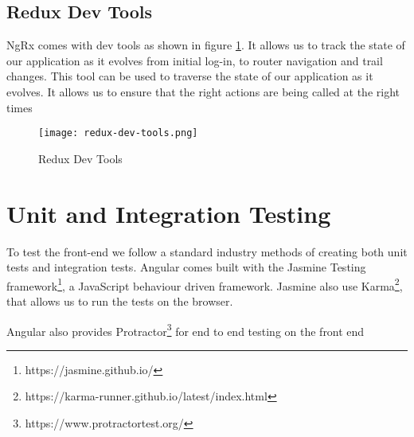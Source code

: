 \subsection{Redux Dev Tools}
NgRx comes with dev tools as shown in figure \ref{fig:reduxDevTools}. It allows us to track the state of our application as it evolves from initial log-in, to router navigation and trail changes. This tool can be used to traverse the state of our application as it evolves. It allows us to ensure that the right actions are being called at the right times
\begin{figure}[ht]
    \centering
    \texttt{[image: redux-dev-tools.png]}
    \caption{Redux Dev Tools}
    \label{fig:reduxDevTools}
\end{figure}


\section{Unit and Integration Testing}
To test the front-end we follow a standard industry methods of creating both unit tests and integration tests. Angular comes built with the Jasmine Testing framework\footnote{https://jasmine.github.io/}, a JavaScript behaviour driven framework. Jasmine also use Karma\footnote{https://karma-runner.github.io/latest/index.html}, that allows us to run the tests on the browser.

Angular also provides Protractor\footnote{https://www.protractortest.org/} for end to end testing on the front end